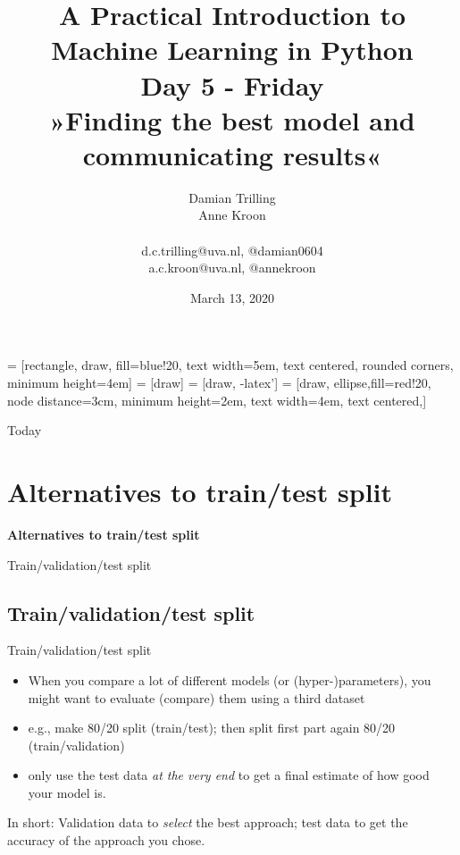\documentclass{beamer}
\begin{document}
\title[Big Data and Automated Content Analysis]{\textbf{A Practical Introduction to Machine Learning in Python} \\Day 5 - Friday \\ »Finding the best model and communicating results«}
\author[Damian Trilling, Anne Kroon]{Damian Trilling \\ Anne Kroon \\ ~ \\ \footnotesize{d.c.trilling@uva.nl, @damian0604 \\a.c.kroon@uva.nl, @annekroon} \\}
\date{March 13, 2020}


 = [rectangle, draw, fill=blue!20, 
text width=5em, text centered, rounded corners, minimum height=4em]
 = [draw]
 = [draw, -latex']
 = [draw, ellipse,fill=red!20, node distance=3cm,
minimum height=2em, text width=4em, text centered,]




\begin{frame}{}
\titlepage
\end{frame}

\begin{frame}{Today}
\tableofcontents
\end{frame}




\section{Alternatives to train/test split}

\begin{frame}[plain]
\textbf{Alternatives to train/test split}

Train/validation/test split 
\end{frame}


\subsection{Train/validation/test split}

\begin{frame}{Train/validation/test split}
\begin{itemize}
\item When you compare a lot of different models (or (hyper-)parameters), you might want to evaluate (compare) them using a third dataset 
\item e.g., make 80/20 split (train/test); then split first part again 80/20 (train/validation)
\item only use the test data \emph{at the very end} to get a final estimate of how good your model is.
\end{itemize}
\pause
In short: Validation data to \emph{select} the best approach; test data to get the accuracy of the approach you chose.
\end{frame}
\end{document}
